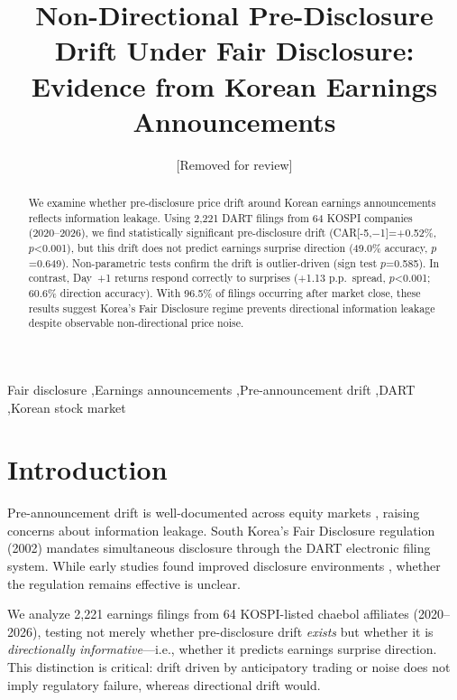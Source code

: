 \documentclass[review,authoryear]{elsarticle}
\begin{document}
\begin{frontmatter}

\title{Non-Directional Pre-Disclosure Drift Under Fair Disclosure: Evidence from Korean Earnings Announcements}

\author{[Removed for review]}

\begin{abstract}
We examine whether pre-disclosure price drift around Korean earnings announcements reflects information leakage. Using 2,221 DART filings from 64 KOSPI companies (2020--2026), we find statistically significant pre-disclosure drift (CAR[-5,$-$1]=+0.52\%, $p$<0.001), but this drift does not predict earnings surprise direction (49.0\% accuracy, $p$=0.649). Non-parametric tests confirm the drift is outlier-driven (sign test $p$=0.585). In contrast, Day~+1 returns respond correctly to surprises (+1.13 p.p.\ spread, $p$<0.001; 60.6\% direction accuracy). With 96.5\% of filings occurring after market close, these results suggest Korea's Fair Disclosure regime prevents directional information leakage despite observable non-directional price noise.
\end{abstract}

\begin{keyword}
Fair disclosure \sep Earnings announcements \sep Pre-announcement drift \sep DART \sep Korean stock market
\end{keyword}

\end{frontmatter}

\section{Introduction}

Pre-announcement drift is well-documented across equity markets \citep{kaniel2012individual}, raising concerns about information leakage. South Korea's Fair Disclosure regulation (2002) mandates simultaneous disclosure through the DART electronic filing system. While early studies found improved disclosure environments \citep{yun2012fair, park2020disclosure}, whether the regulation remains effective is unclear.

We analyze 2,221 earnings filings from 64 KOSPI-listed chaebol affiliates (2020--2026), testing not merely whether pre-disclosure drift \textit{exists} but whether it is \textit{directionally informative}---i.e., whether it predicts earnings surprise direction. This distinction is critical: drift driven by anticipatory trading or noise does not imply regulatory failure, whereas directional drift would.
\end{document}
